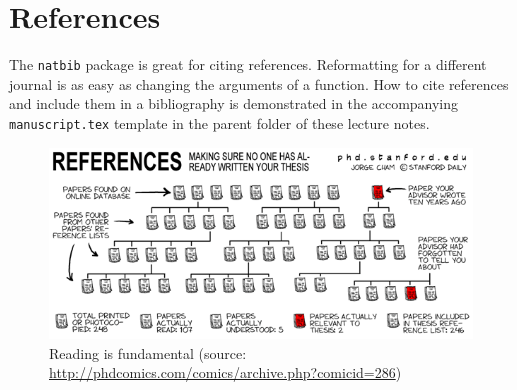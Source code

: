 \documentclass[12pt,letterpaper]{article}
\begin{document}






\section{References}

The \texttt{natbib} package is great for citing references.
Reformatting for a different journal is as easy as changing the arguments of a function.
How to cite references and include them in a bibliography is demonstrated in the accompanying
\texttt{manuscript.tex} template in the parent folder of these lecture notes.

\begin{figure}
	\centering
	\includegraphics[width=1\linewidth]{figs/phd022702s.png}
	\caption{Reading is fundamental (source: \url{http://phdcomics.com/comics/archive.php?comicid=286})}
	\label{fig:phdrefs}
\end{figure}
\end{document}
